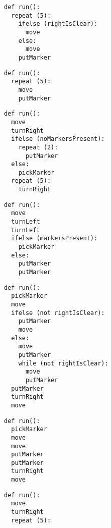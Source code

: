 \begin{figure}
\begin{minipage}{0.25\textwidth}
\begin{verbatim}
def run():
  repeat (5):
    ifelse (rightIsClear):
      move
    else:
      move
    putMarker
\end{verbatim}
\end{minipage}
\begin{minipage}{0.20\textwidth}
\begin{verbatim}
def run():
  repeat (5):
    move
    putMarker
\end{verbatim}
\end{minipage}
\begin{minipage}{0.25\textwidth}
\begin{verbatim}
def run():
  move
  turnRight
  ifelse (noMarkersPresent):
    repeat (2):
      putMarker
  else:
    pickMarker
  repeat (5):
    turnRight
\end{verbatim}
\end{minipage}
\begin{minipage}{0.25\textwidth}
\begin{verbatim}
def run():
  move
  turnLeft
  turnLeft
  ifelse (markersPresent):
    pickMarker
  else:
    putMarker
    putMarker
\end{verbatim}
\end{minipage}
\par\vspace{3mm}
\begin{minipage}{0.3\textwidth}
\begin{verbatim}
def run():
  pickMarker
  move
  ifelse (not rightIsClear):
    putMarker
    move
  else:
    move
    putMarker
    while (not rightIsClear):
      move
      putMarker
  putMarker
  turnRight
  move
\end{verbatim}
\end{minipage}
\begin{minipage}{0.20\textwidth}
\begin{verbatim}
def run():
  pickMarker
  move
  move
  putMarker
  putMarker
  turnRight
  move
\end{verbatim}
\end{minipage}
\begin{minipage}{0.20\textwidth}
\begin{verbatim}
def run():
  move
  turnRight
  repeat (5):

\end{verbatim}
\end{minipage}
\end{figure}
